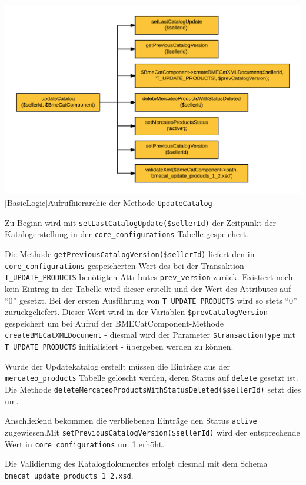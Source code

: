 	\begin{minipage}{\linewidth}
		\vspace{1em}
		\centering
		\includegraphics[width=0.7 \linewidth]{img/updateKatalogAufrufhierarchie}
		[BasicLogic]{Aufrufhierarchie der Methode \texttt{UpdateCatalog}}
		\vspace{1em}
	\end{minipage}
	
	Zu Beginn wird mit \texttt{setLastCatalogUpdate(\$sellerId)} der Zeitpunkt der Katalogerstellung in der \texttt{core\_configurations} Tabelle gespeichert.  
	
	Die Methode \texttt{getPreviousCatalogVersion(\$sellerId)} liefert den in \texttt{core\_configurations} gespeicherten Wert des bei der Transaktion \texttt{T\_UPDATE\_PRODUCTS} benötigten Attributes \texttt{prev\_version} zurück. Existiert noch kein Eintrag in der Tabelle wird dieser erstellt und der Wert des Attributes auf \enquote{0} gesetzt. Bei der ersten Ausführung von \texttt{T\_UPDATE\_PRODUCTS} wird so stets \enquote{0} zurückgeliefert. Dieser Wert wird in der Variablen \texttt{\$prevCatalogVersion} gespeichert um bei Aufruf der BMECatComponent-Methode \texttt{createBMECatXMLDocument} - diesmal wird der Parameter \texttt{\$transactionType} mit \texttt{T\_UPDATE\_PRODUCTS} initialisiert - übergeben werden zu können.
	
	Wurde der Updatekatalog erstellt müssen die Einträge aus der \texttt{mercateo\_products} Tabelle gelöscht werden, deren Status auf \texttt{delete} gesetzt ist. Die Methode \texttt{deleteMercateoProductsWithStatusDeleted(\$sellerId)} setzt dies um.
	
	Anschließend bekommen die verbliebenen Einträge den Status \texttt{active} zugewiesen.Mit \texttt{setPreviousCatalogVersion(\$sellerId)} wird der entsprechende Wert in \texttt{core\_configurations} um 1 erhöht.
	
	Die Validierung des Katalogdokumentes erfolgt diesmal mit dem Schema \texttt{bmecat\_update\_products\_1\_2.xsd}.
	

